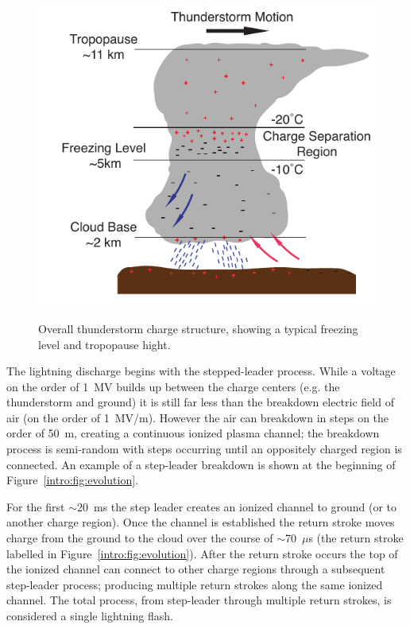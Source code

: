 \begin{figure}[ht!]
	\centering
	\includegraphics[scale=1]{Introduction/Figures/thunderstorm_structure.pdf}\\
	\caption{Overall thunderstorm charge structure, showing a typical freezing level and tropopause hight.}
	\label{intro:fig:thunderstorm}
\end{figure}

The lightning discharge begins with the stepped-leader process.
While a voltage on the order of 1~MV builds up between the charge centers (e.g. the thunderstorm and ground) it is still far less than the breakdown electric field of air (on the order of 1~MV/m).
However the air can breakdown in steps on the order of 50~m, creating a continuous ionized plasma channel; the breakdown process is semi-random with steps occurring until an oppositely charged region is connected.
An example of a step-leader breakdown is shown at the beginning of Figure~\ref{intro:fig:evolution}.

For the first $\sim$20~ms the step leader creates an ionized channel to ground (or to another charge region).
Once the channel is established the return stroke moves charge from the ground to the cloud over the course of $\sim$70~$\mu$s (the return stroke labelled in Figure~\ref{intro:fig:evolution}).
After the return stroke occurs the top of the ionized channel can connect to other charge regions through a subsequent step-leader process; producing multiple return strokes along the same ionized channel.
The total process, from step-leader through multiple return strokes, is considered a single lightning flash.


